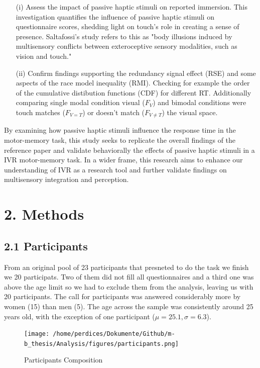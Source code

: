\documentclass[12pt,oneside,openright]{report}
\begin{document}
\begin{itemize}
  \item[(i)] Assess the impact of passive haptic stimuli on reported immersion. This investigation quantifies the influence of passive haptic stimuli on questionnaire scores, shedding light on touch's role in creating a sense of presence. Saltafossi's study refers to this as "body illusions induced by multisensory conflicts between exteroceptive sensory modalities, such as vision and touch."
    
  \item[(ii)] Confirm findings supporting the redundancy signal effect (RSE) and some aspects of the race model inequality (RMI). Checking for example the order of the cumulative distibution functions (CDF) for different RT. Additionally comparing single modal condition visual ($F_V$) and bimodal conditions were touch matches ($F_{V=T}$) or doesn’t match ($F_{V \neq T}$) the visual space. 
\end{itemize}

By examining how passive haptic stimuli influence the response time in the motor-memory task, this study seeks to replicate the overall findings of the reference paper \parencite*{SALTAFOSSI2023108642} and validate behaviorally the effects of passive haptic stimuli in a IVR motor-memory task. In a wider frame, this research aims to enhance our understanding of IVR as a research tool and further validate findings on multisensory integration and perception.

\section*{2. Methods}
    \subsection*{2.1 Participants}
    From an original pool of 23 participants that presneted to do the task we finish we 20 participats. Two of them did not fill all questionnaires and a third one was above the age limit  so we had to exclude them from the analysis, leaving us with 20 participants. The call for participants was answered considerably more by women (15) than men (5). The age across the sample was consistently around 25 years old, with the exception of one participant ($\mu=25.1 , \sigma=6.3$).
    \begin{figure}[h]
        \centering
        \texttt{[image: /home/perdices/Dokumente/Github/m-b\_thesis/Analysis/figures/participants.png]}
        \caption{Participants Composition}
        \label{fig:mesh1}
    \end{figure}
    
\end{document}
